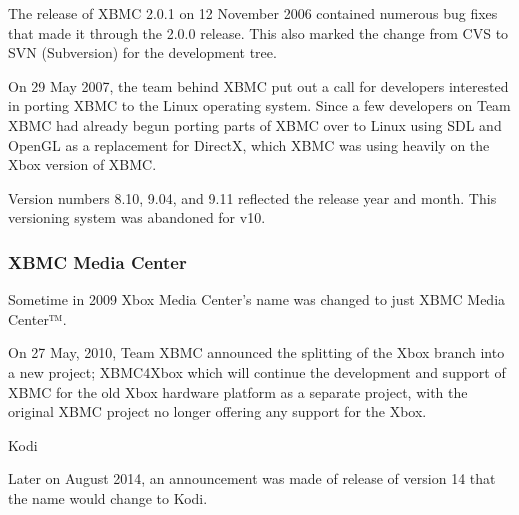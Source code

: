 \documentclass[12pt]{report}
\begin{document}
\vspace{\baselineskip}
The release of XBMC 2.0.1 on 12 November 2006 contained numerous bug fixes that made it through the 2.0.0 release. This also marked the change from CVS to SVN (Subversion) for the development tree.\par


\vspace{\baselineskip}
On 29 May 2007, the team behind XBMC put out a call for developers interested in porting XBMC to the Linux operating system. Since a few developers on Team XBMC had already begun porting parts of XBMC over to Linux using SDL and OpenGL as a replacement for DirectX, which XBMC was using heavily on the Xbox version of XBMC.\par


\vspace{\baselineskip}
Version numbers 8.10, 9.04, and 9.11 reflected the release year and month. This versioning system was abandoned for v10.\par


\vspace{\baselineskip}
\subsubsection*{XBMC Media Center}
Sometime in 2009 Xbox Media Center's name was changed to just XBMC Media Center™.\par


\vspace{\baselineskip}
On 27 May, 2010, Team XBMC announced the splitting of the Xbox branch into a new project; XBMC4Xbox which will continue the development and support of XBMC for the old Xbox hardware platform as a separate project, with the original XBMC project no longer offering any support for the Xbox.\par


\vspace{\baselineskip}
Kodi\par

Later on August 2014, an announcement was made of release of version 14 that the name would change to Kodi.\par


\vspace{\baselineskip}



\newpage
\end{document}
